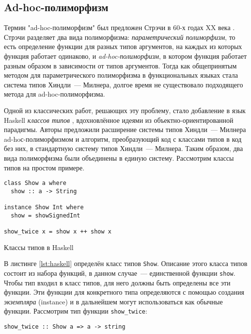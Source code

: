 \documentclass[../diploma.tex]{subfiles}
\begin{document}
\subsection{Ad-hoc-полиморфизм}

Термин "ad-hoc-полиморфизм" был предложен Стрэчи в 60-х годах XX века \cite{strachey}. Стрэчи разделяет два вида полиморфизма: \textit{параметрический полиморфизм}, то есть определение функции для разных типов аргументов, на каждых из которых функция работает одинаково, и \textit{ad-hoc-полиморфизм}, в котором функция работает разным образом в зависимости от типов аргументов. Тогда как общепринятым методом для параметрического полиморфизма в функциональных языках стала система типов Хиндли~--- Милнера, долгое время не существовало подходящего метода для ad-hoc-полиморфизма.

Одной из классических работ, решающих эту проблему, стало добавление в язык Haskell \textit{классов типов} \cite{adhoc}, вдохновлённое идеями из объектно-ориентированной парадигмы. Авторы предложили расширение системы типов Хиндли~--- Милнера ad-hoс-полиморфизмом и алгоритм, преобразующий код с классами типов в код без них, в стандартную систему типов Хиндли~--- Милнера. Таким образом, два вида полиморфизма были объединены в единую систему. Рассмотрим классы типов на простом примере.

\begin{listing}[H]
\begin{verbatim}
class Show a where
  show :: a -> String

instance Show Int where
  show = showSignedInt

show_twice x = show x ++ show x
\end{verbatim}
\caption{Классы типов в Haskell}
\label{lst:haskell}
\end{listing}

В листинге \ref{lst:haskell} определён класс типов \texttt{Show}. Описание этого класса типов состоит из набора функций, в данном случае~--- единственной функции \texttt{show}. Чтобы тип входил в класс типов, для него должны быть определены все эти функции. Эти функции для конкретного типа определяются с помощью создания \textit{экземпляра} (instance) и в дальнейшем могут использоваться как обычные функции. Рассмотрим тип функции \texttt{show_twice}:

\begin{verbatim}
show_twice :: Show a => a -> string
\end{verbatim}
\end{document}
